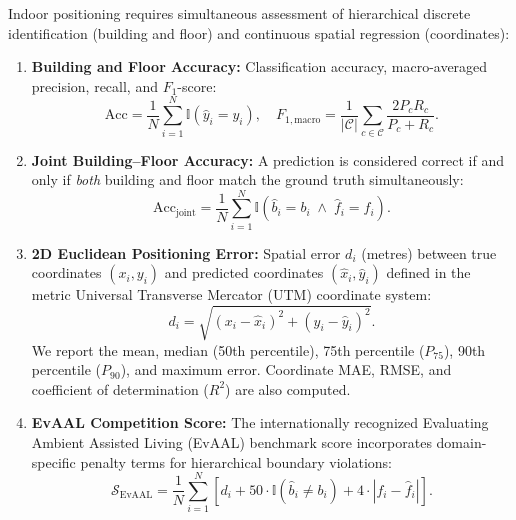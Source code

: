 Indoor positioning requires simultaneous assessment of hierarchical discrete identification (building and floor) and continuous spatial regression (coordinates):
\begin{enumerate}
    \item \textbf{Building and Floor Accuracy:} Classification accuracy, macro-averaged precision, recall, and $F_1$-score:
    \begin{equation}
        \text{Acc} = \frac{1}{N} \sum_{i=1}^N \mathbb{I}(\hat{y}_i = y_i), \quad F_{1,\text{macro}} = \frac{1}{|\mathcal{C}|} \sum_{c \in \mathcal{C}} \frac{2 P_c R_c}{P_c + R_c}.
    \end{equation}
    \item \textbf{Joint Building--Floor Accuracy:} A prediction is considered correct if and only if \emph{both} building and floor match the ground truth simultaneously:
    \begin{equation}
        \text{Acc}_{\text{joint}} = \frac{1}{N} \sum_{i=1}^N \mathbb{I}(\hat{b}_i = b_i \;\land\; \hat{f}_i = f_i).
    \end{equation}
    \item \textbf{2D Euclidean Positioning Error:} Spatial error $d_i$ (metres) between true coordinates $(x_i, y_i)$ and predicted coordinates $(\hat{x}_i, \hat{y}_i)$ defined in the metric Universal Transverse Mercator (UTM) coordinate system:
    \begin{equation}
        d_i = \sqrt{(x_i - \hat{x}_i)^2 + (y_i - \hat{y}_i)^2}.
    \end{equation}
    We report the mean, median (50th percentile), 75th percentile ($P_{75}$), 90th percentile ($P_{90}$), and maximum error. Coordinate MAE, RMSE, and coefficient of determination ($R^2$) are also computed.
    \item \textbf{EvAAL Competition Score:} The internationally recognized Evaluating Ambient Assisted Living (EvAAL) benchmark score incorporates domain-specific penalty terms for hierarchical boundary violations:
    \begin{equation}
        \mathcal{S}_{\text{EvAAL}} = \frac{1}{N} \sum_{i=1}^N \left[ d_i + 50 \cdot \mathbb{I}(\hat{b}_i \neq b_i) + 4 \cdot |f_i - \hat{f}_i| \right].
    \end{equation}
\end{enumerate}

